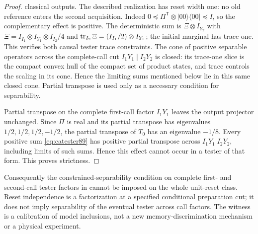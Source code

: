 \begin{proof}
classical outputs.  The described realization has reset width one:
no old reference enters the second acquisition.
Indeed $0\preceq\Pi^{\mathsf T}\otimes|00\rangle\langle00|\preceq I$,
so the complementary effect is positive.  The deterministic sum is
$\Xi\otimes I_{Y_2}$ with
$\Xi=I_{I_1}\otimes I_{Y_1}\otimes I_{I_2}/4$ and
$\operatorname{tr}_{I_2}\Xi=(I_{I_1}/2)\otimes I_{Y_1}$; the initial marginal has
trace one.  This verifies both causal tester trace constraints.
The cone of positive separable operators across the complete-call cut
$I_1Y_1\mid I_2Y_2$ is closed: its trace-one slice is the compact convex
hull of the compact set of product states, and trace controls the scaling
in its cone.  Hence the limiting sums mentioned below lie in this same
closed cone.  Partial transpose is used only as a necessary condition
for separability.

Partial transpose on the complete first-call factor $I_1Y_1$ leaves
the output projector unchanged.  Since $\Pi$ is real and its partial
transpose has eigenvalues $1/2,1/2,1/2,-1/2$, the partial transpose of
$T_0$ has an eigenvalue $-1/8$.  Every positive sum
\eqref{eq:catester89} has positive partial transpose across
$I_1Y_1|I_2Y_2$, including limits of such sums.  Hence this effect
cannot occur in a tester of that form.  This proves strictness.
\end{proof}

Consequently the constrained-separability condition on complete
first- and second-call tester factors in \cite[(65)--(68)]{OZNPQ89}
cannot be imposed on the whole unit-reset class.  Reset independence
is a factorization at a specified conditional preparation cut; it
does not imply separability of the eventual tester across call
factors.  The witness is a calibration of model inclusions, not a
new memory-discrimination mechanism or a physical experiment.
